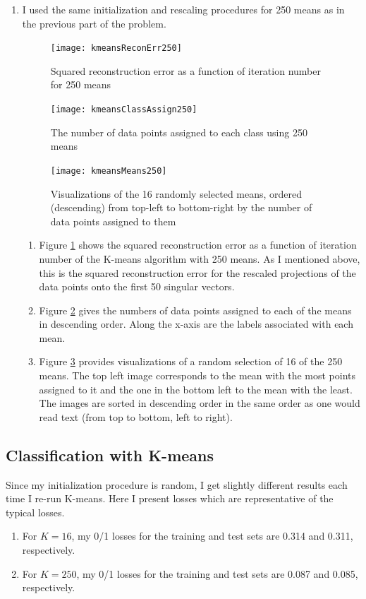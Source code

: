 \documentclass{article}
\begin{document}
\begin{enumerate}
	\item I used the same initialization and rescaling procedures for 250 means as in the previous part of the problem.

	\begin{figure}
		\centering
	    	\texttt{[image: kmeansReconErr250]}
	    	\caption{Squared reconstruction error as a function of iteration number for 250 means}
	    	\label{fig:kmErr250}
	\end{figure}
	\begin{figure}
		\centering
	    	\texttt{[image: kmeansClassAssign250]}
	    	\caption{The number of data points assigned to each class using 250 means}
	    	\label{fig:kmAs250}
	\end{figure}

	\begin{figure}
		\centering
		\texttt{[image: kmeansMeans250]}
		\caption{Visualizations of the 16 randomly selected means, ordered (descending) from top-left to bottom-right by the number of data points assigned to them}
		\label{fig:kmVis250}
	\end{figure}

	\begin{enumerate}
		\item Figure \ref{fig:kmErr250} shows the squared reconstruction error as a function of iteration number of the K-means algorithm with 250 means. As I mentioned above, this is the squared reconstruction error for the rescaled projections of the data points onto the first 50 singular vectors.
		\item Figure \ref{fig:kmAs250} gives the numbers of data points assigned to each of the means in descending order. Along the x-axis are the labels associated with each mean.
		\item Figure \ref{fig:kmVis250} provides visualizations of a random selection of 16 of the 250 means. The top left image corresponds to the mean with the most points assigned to it and the one in the bottom left to the mean with the least. The images are sorted in descending order in the same order as one would read text (from top to bottom, left to right).
	\end{enumerate}
\end{enumerate}

\subsection{Classification with K-means}
Since my initialization procedure is random, I get slightly different results each time I re-run K-means. Here I present losses which are representative of the typical losses.
\begin{enumerate}
	\item For $K=16$, my 0/1 losses for the training and test sets are 0.314 and 0.311, respectively.
	\item For $K=250$, my 0/1 losses for the training and test sets are 0.087 and 0.085, respectively.
\end{enumerate}
\end{document}
